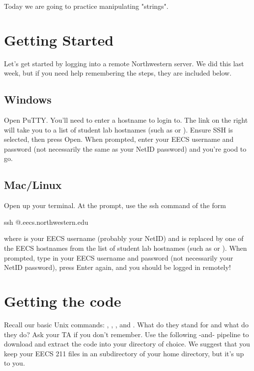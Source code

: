 \documentclass{tufte-handout}
\begin{document}
\maketitle

Today we are going to practice manipulating "strings".

\section{Getting Started}
Let's get started by logging into a remote Northwestern server. We did this last week, but if you need help remembering the steps, they are included below.

\subsection{Windows}
Open PuTTY. You'll need to enter a hostname to login to. The link on the
right will take you to a list of student lab hostnames (such as  or ).  Ensure SSH is selected, then press Open. When prompted, enter your EECS username and password (not necessarily the same as your NetID password) and you're good to go.

\subsection{Mac/Linux}
Open up your terminal. At the prompt, use the ssh command of the form
\begin{CmdLine}
  \prompt ssh @.eecs.northwestern.edu
\end{CmdLine}
\noindent where  is your EECS username (probably your NetID)
and  is replaced by one of the EECS hostnames from the list
of student lab hostnames (such as  or
).
When prompted, type in your EECS username and password (not necessarily your NetID password), press
Enter again, and you should be logged in remotely!

\section{Getting the code} Recall our basic Unix commands:
, , , and . What
do they stand for and what do they do? Ask your TA if you don't
remember. Use the following
-and- pipeline to download and extract the
code into your directory of choice. We suggest that you keep your EECS
211 files in an  subdirectory of your home directory,
but it's up to you.
\end{document}
